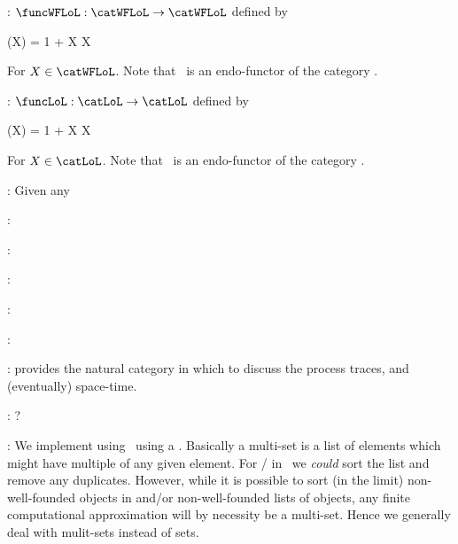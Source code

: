 \item {}: $\funcWFLoL : \catWFLoL \rightarrow \catWFLoL$ 
defined by 

\placeformula[+]\startformula
  \funcWFLoL(X) = 1 + X \times X
\stopformula

\noindent For $X \in \catWFLoL$. Note that \funcWFLoL\ is an endo-functor of 
the category \catWFLoL. 

\item {}: $\funcLoL : \catLoL \rightarrow \catLoL$ 
defined by 

\placeformula[+]\startformula
  \funcLoL(X) = 1 + X \times X
\stopformula

\noindent For $X \in \catLoL$. Note that \funcLoL\ is an endo-functor of 
the category \catLoL. 

\item {}: Given any 

\item {}:

\item {}:

\item {}:

\item {}:

\item {}:

\item {}: provides the natural 
category in which to discuss the process traces, and (eventually) space-time.

\item {}: ?

\item {}: We implement  using \lols\ using a 
. Basically a multi-set is a list of elements which might 
have multiple  of any given element. For 
/ in \wflol\ we \emph{could} sort the list 
and remove any duplicates. However, while it is possible to sort (in the 
limit) non-well-founded objects in \lol and/or non-well-founded lists of 
objects, any finite computational approximation will by necessity be a 
multi-set. Hence we generally deal with mulit-sets instead of sets. 

